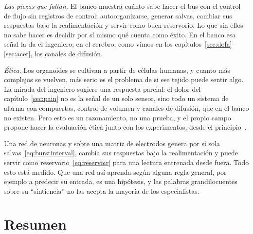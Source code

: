 \emph{Las piezas que faltan.} El banco muestra cuánto sabe hacer el bus  con el control de flujo  sin registros de control: autoorganizarse, generar salvas, cambiar sus respuestas bajo la realimentación y servir como buen reservorio. Lo que sin ellos no sabe hacer es decidir por sí mismo qué cuenta como éxito. En el banco esa señal la da el ingeniero; en el cerebro, como vimos en los capítulos~\ref{sec:dofa}--\ref{sec:acet}, los canales de difusión.

\emph{Ética.} Los organoides se cultivan a partir de células humanas, y cuanto más complejos se vuelven, más serio es el problema de si ese tejido puede sentir algo. La mirada del ingeniero sugiere una respuesta parcial: el dolor del capítulo~\ref{sec:pain} no es la señal de un solo sensor, sino todo un sistema de alarma con compuertas, control de volumen y canales de difusión, que en el banco no existen. Pero esto es un razonamiento, no una prueba, y el propio campo propone hacer la evaluación ética junto con los experimentos, desde el principio~\cite{Smirnova2023}.

\begin{keyblock}
\begin{proposition}
\label{prop:livingmachine}
Una red de neuronas  y  sobre una matriz de electrodos genera por sí sola salvas~\eqref{eq:burstinterval}, cambia sus respuestas bajo la realimentación y puede servir como reservorio~\eqref{eq:reservoir} para una lectura entrenada desde fuera. Todo esto está medido. Que una red así aprenda según alguna regla general, por ejemplo a predecir su entrada, es una hipótesis, y las palabras grandilocuentes sobre su “sintiencia” no las acepta la mayoría de los especialistas.
\end{proposition}
\end{keyblock}



\section{Resumen}

